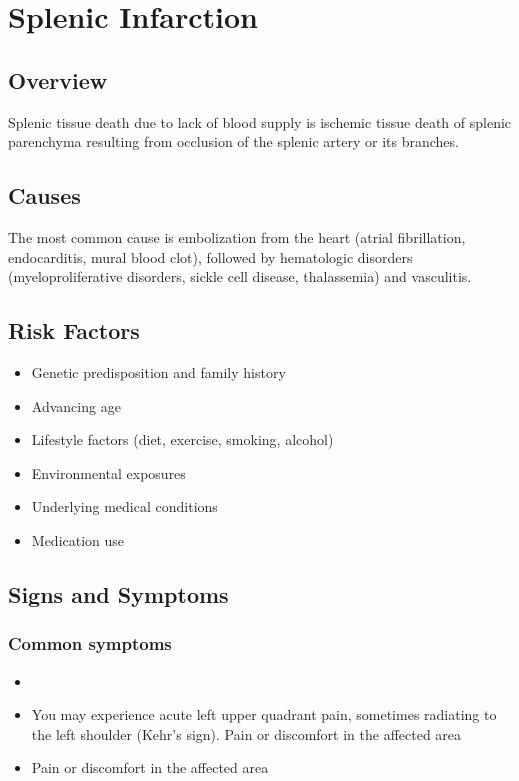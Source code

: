\chapter{Splenic Infarction}
\label{sec:Splenic Infarction}

\section{Overview}
Splenic tissue death due to lack of blood supply is ischemic tissue death of splenic parenchyma resulting from occlusion of the splenic artery or its branches.
\section{Causes}
The most common cause is embolization from the heart (atrial fibrillation, endocarditis, mural blood clot), followed by hematologic disorders (myeloproliferative disorders, sickle cell disease, thalassemia) and vasculitis.     
\section{Risk Factors}

\begin{itemize}[noitemsep]
  \item Genetic predisposition and family history
  \item Advancing age
  \item Lifestyle factors (diet, exercise, smoking, alcohol)
  \item Environmental exposures
  \item Underlying medical conditions
  \item Medication use
\end{itemize}
\section{Signs and Symptoms}

\subsection{Common symptoms}
\begin{itemize}[noitemsep]
  \item \item You may experience acute left upper quadrant pain, sometimes radiating to the left shoulder (Kehr's sign). Pain or discomfort in the affected area    \item Pain or discomfort in the affected area
  \end{itemize}

